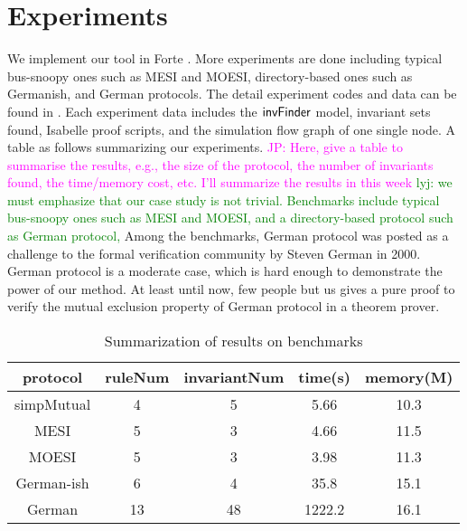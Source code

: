 \documentclass{llncs}
\newcommand\JP[1]{\textcolor{magenta}{JP: #1}}
\newcommand\lyj[1]{\textcolor{green}{lyj: #1}}
\begin{document}
\section{Experiments}
We implement our tool in Forte \cite{Forte}. More experiments are
done including typical bus-snoopy ones such as MESI and MOESI,
 directory-based ones such as Germanish, and  German protocols. The detail experiment codes and data can
be found in \cite{LiCache14}. Each experiment data includes the
${\sf invFinder}$ model, invariant sets found, Isabelle proof
scripts, and the simulation flow graph of one single node. A table
as follows summarizing  our experiments.  \JP{Here, give a table to
summarise the results, e.g., the size of the protocol, the number of
invariants found, the time/memory cost, etc. I'll summarize the
results in this week}
 \lyj{we must emphasize that our case study is not trivial.
 Benchmarks include typical bus-snoopy ones such as MESI and MOESI,
 and a directory-based protocol such as German protocol, } Among the benchmarks, German protocol   was posted
 as
a challenge to the formal verification community by Steven German in
2000. German protocol is a moderate case, which is hard enough to
demonstrate the power of our method. %
At  least until now, few people but us gives a pure proof to verify
the mutual exclusion
 property of German protocol
 in a theorem prover.

 \begin{table}[htbp] \label{Summarization of experiment results}
\centering \caption{Summarization of results on benchmarks}
\begin{tabular}{|c|c|c|c|c|}
\hline
protocol &  ruleNum & invariantNum & time(s) & memory(M) \\
\hline
simpMutual& 4& 5 & 5.66 & 10.3 \\
\hline
MESI & 5& 3 & 4.66 & 11.5  \\
\hline
MOESI &  5& 3 &3.98 & 11.3  \\
\hline
German-ish & 6& 4 &35.8 & 15.1   \\
\hline
German & 13 & 48 & 1222.2 & 16.1   \\
\hline
\end{tabular}
\end{table}
\end{document}
